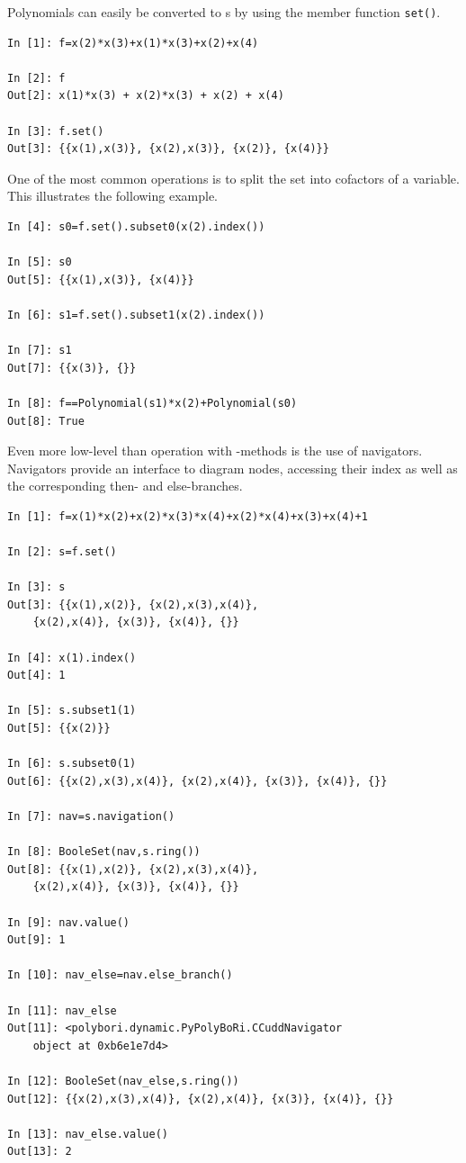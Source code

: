 Polynomials can easily be converted to s by using the
member function \lstinline|set()|.
\begin{lstlisting}
In [1]: f=x(2)*x(3)+x(1)*x(3)+x(2)+x(4)

In [2]: f
Out[2]: x(1)*x(3) + x(2)*x(3) + x(2) + x(4)

In [3]: f.set()
Out[3]: {{x(1),x(3)}, {x(2),x(3)}, {x(2)}, {x(4)}}
\end{lstlisting}
%
One of the most common operations is to split the set into cofactors of a
variable. This illustrates the following example.
%
\begin{lstlisting}
In [4]: s0=f.set().subset0(x(2).index())

In [5]: s0
Out[5]: {{x(1),x(3)}, {x(4)}}

In [6]: s1=f.set().subset1(x(2).index())

In [7]: s1
Out[7]: {{x(3)}, {}}

In [8]: f==Polynomial(s1)*x(2)+Polynomial(s0)
Out[8]: True
\end{lstlisting}
%

Even more low-level than operation with -methods is the use
of navigators. Navigators  provide an interface to diagram nodes, accessing
their index as well as the corresponding then- and else-branches.

\begin{lstlisting}
In [1]: f=x(1)*x(2)+x(2)*x(3)*x(4)+x(2)*x(4)+x(3)+x(4)+1

In [2]: s=f.set()

In [3]: s
Out[3]: {{x(1),x(2)}, {x(2),x(3),x(4)},
    {x(2),x(4)}, {x(3)}, {x(4)}, {}}

In [4]: x(1).index()
Out[4]: 1

In [5]: s.subset1(1)
Out[5]: {{x(2)}}

In [6]: s.subset0(1)
Out[6]: {{x(2),x(3),x(4)}, {x(2),x(4)}, {x(3)}, {x(4)}, {}}

In [7]: nav=s.navigation()

In [8]: BooleSet(nav,s.ring())
Out[8]: {{x(1),x(2)}, {x(2),x(3),x(4)},
    {x(2),x(4)}, {x(3)}, {x(4)}, {}}

In [9]: nav.value()
Out[9]: 1

In [10]: nav_else=nav.else_branch()

In [11]: nav_else
Out[11]: <polybori.dynamic.PyPolyBoRi.CCuddNavigator
    object at 0xb6e1e7d4>

In [12]: BooleSet(nav_else,s.ring())
Out[12]: {{x(2),x(3),x(4)}, {x(2),x(4)}, {x(3)}, {x(4)}, {}}

In [13]: nav_else.value()
Out[13]: 2
\end{lstlisting}

